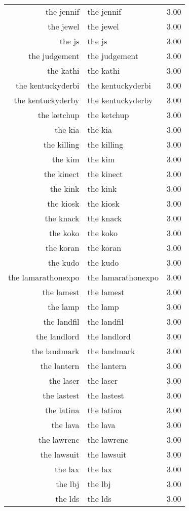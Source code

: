 \begin{table}[ht]
\begin{tabular}{rlr}
  the jennif & the jennif & 3.00 \\ 
  the jewel & the jewel & 3.00 \\ 
  the js & the js & 3.00 \\ 
  the judgement & the judgement & 3.00 \\ 
  the kathi & the kathi & 3.00 \\ 
  the kentuckyderbi & the kentuckyderbi & 3.00 \\ 
  the kentuckyderby & the kentuckyderby & 3.00 \\ 
  the ketchup & the ketchup & 3.00 \\ 
  the kia & the kia & 3.00 \\ 
  the killing & the killing & 3.00 \\ 
  the kim & the kim & 3.00 \\ 
  the kinect & the kinect & 3.00 \\ 
  the kink & the kink & 3.00 \\ 
  the kiosk & the kiosk & 3.00 \\ 
  the knack & the knack & 3.00 \\ 
  the koko & the koko & 3.00 \\ 
  the koran & the koran & 3.00 \\ 
  the kudo & the kudo & 3.00 \\ 
  the lamarathonexpo & the lamarathonexpo & 3.00 \\ 
  the lamest & the lamest & 3.00 \\ 
  the lamp & the lamp & 3.00 \\ 
  the landfil & the landfil & 3.00 \\ 
  the landlord & the landlord & 3.00 \\ 
  the landmark & the landmark & 3.00 \\ 
  the lantern & the lantern & 3.00 \\ 
  the laser & the laser & 3.00 \\ 
  the lastest & the lastest & 3.00 \\ 
  the latina & the latina & 3.00 \\ 
  the lava & the lava & 3.00 \\ 
  the lawrenc & the lawrenc & 3.00 \\ 
  the lawsuit & the lawsuit & 3.00 \\ 
  the lax & the lax & 3.00 \\ 
  the lbj & the lbj & 3.00 \\ 
  the lds & the lds & 3.00 \\ 

\end{tabular}
\end{table}
